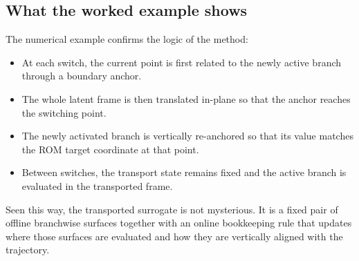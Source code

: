 \documentclass[11pt,a4paper]{article}
\begin{document}
\subsection{What the worked example shows}

The numerical example confirms the logic of the method:

\begin{itemize}
\item At each switch, the current point is first related to the newly active branch through a boundary anchor.
\item The whole latent frame is then translated in-plane so that the anchor reaches the switching point.
\item The newly activated branch is vertically re-anchored so that its value matches the ROM target coordinate at that point.
\item Between switches, the transport state remains fixed and the active branch is evaluated in the transported frame.
\end{itemize}

Seen this way, the transported surrogate is not mysterious. It is a fixed pair of offline branchwise surfaces together with an online bookkeeping rule that updates where those surfaces are evaluated and how they are vertically aligned with the trajectory.
\end{document}
